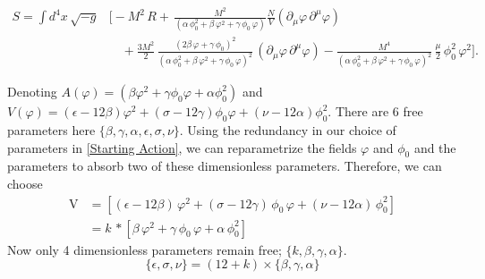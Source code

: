 \documentclass[aps,prd,reprint,preprintnumbers,showpacs,floatfix,nofootinbib,superscript address]{revtex4-2}
\begin{document}
\begin{widetext}
    \begin{equation}    \label{33a}
    \begin{aligned}
        S = \int d^4x\, \sqrt{-g} &\Biggl[- M^2\, R + \,\frac{M^2}{(\alpha\,\phi_0^2+\beta\,\varphi^2+\gamma\,\phi_0\,\varphi)}
        \frac{N}{V} (\partial_{\mu}\varphi\,\partial^{\mu}\varphi) \\[2mm]
        &\quad + \frac{3M^2}{2}\,\frac{(2\beta\,\varphi+\gamma\,\phi_0)^2}{(\alpha\,\phi_0^2+\beta\,\varphi^2+\gamma\,\phi_0\,\varphi)^2}\,(\partial_{\mu}\varphi\,\partial^{\mu}\varphi) - \frac{M^4}{(\alpha\,\phi_0^2+\beta\,\varphi^2+\gamma\,\phi_0\,\varphi)^2}\,\frac{\mu}{2}\,\phi_0^2\,\varphi^2 \Biggr].
    \end{aligned}
    \end{equation}
\end{widetext}
Denoting $A(\varphi) = (\beta\varphi^2+\gamma\phi_0\varphi+\alpha\phi_0^2)$ and $V(\varphi) = (\epsilon - 12\beta) \varphi^2 + (\sigma - 12\gamma) \phi_0  \varphi + (\nu - 12\alpha)\phi^2_0$. There are 6 free parameters here $\{ \beta, \gamma, \alpha , \epsilon, \sigma, \nu \}$. Using the redundancy in our choice of parameters in \ref{Starting Action}, we can reparametrize the fields $\varphi$ and $\phi_0$ and the parameters to absorb two of these dimensionless parameters. Therefore, we can choose\[
\begin{split}
\text{V} &= \left[(\epsilon - 12\beta)\,\varphi^2 + (\sigma - 12\gamma)\,\phi_0\,\varphi + (\nu - 12\alpha)\,\phi_0^2\right] \\
         &= k\,*\left[\beta\,\varphi^2 + \gamma\,\phi_0\,\varphi + \alpha\,\phi_0^2\right]
\end{split}
\]
Now only 4 dimensionless parameters remain free; $\{k, \beta, \gamma, \alpha \}$.
\begin{equation} \label{Variable Dictionary}
    \{ \epsilon , \sigma, \nu\} = (12+k) \times \{\beta , \gamma ,\alpha \}    
\end{equation}
\end{document}
